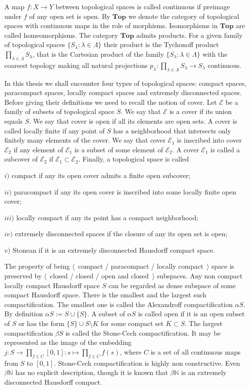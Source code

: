 A map $f:X\to Y$ between topological spaces is called continuous if preimage under $f$ of any open set is open. By $\mathbf{Top}$ we denote the category of topological spaces with continuous maps in the role of morphisms. Isomorphisms in $\mathbf{Top}$ are called homeomorphisms. The category $\mathbf{Top}$ admits  products. For a given family of topological spaces $\{S_\lambda:\lambda\in\Lambda\}$ their product is the Tychonoff product $\prod_{\lambda\in\Lambda}S_\lambda$, that is the Cartesian product of the family $\{S_\lambda:\lambda\in\Lambda\}$ with the coarsest topology making all natural projections $p_\lambda:\prod_{\lambda\in\Lambda}S_\lambda\to S_\lambda$ continuous.

In this thesis we shall encounter four types of topological spaces: compact spaces, paracompact spaces, locally compact spaces and extremely disconnected spaces. Before giving their definitions we need to recall the notion of cover. Let $\mathcal{E}$ be a family of subsets of topological space $S$. We say that $\mathcal{E}$ is a cover if its union equals $S$. We say that cover is open if all its elements are open sets. A cover is called locally finite if any point of $S$ has a neighborhood that intersects only finitely many elements of the cover. We say that cover $\mathcal{E}_1$ is inscribed into cover $\mathcal{E}_2$ if any element of $\mathcal{E}_1$ is a subset of some element of $\mathcal{E}_2$. A cover $\mathcal{E}_1$ is called a subcover of $\mathcal{E}_2$ if $\mathcal{E}_1\subset\mathcal{E}_2$. Finally, a topological space is called 

$i)$ compact if any its open cover admits a finite open subcover; 

$ii)$ paracompact if any its open cover is inscribed into some locally finite open cover; 

$iii)$ locally compact if any its point has a compact neighborhood;

$iv)$ extremely disconnected spaces if the closure of any its open set is open;

$v)$ Stonean if it is an extremely disconnected Hausdorff compact space.

The property of being $\langle$~compact / paracompact / locally compact~$\rangle$ space is preserved by $\langle$~closed / closed / open and closed~$\rangle$ subspaces. Any non compact locally compact Hausdorff space $S$ can be regarded as dense subspace of some compact Hausdorff space. There is the smallest and the largest such compactification. The smallest one is called the Alexandroff compactification $\alpha S$.  By definition $\alpha S:=S\cup \{S\}$. A subset of $\alpha S$ is called open if it is an open subset of $S$ or has the form $\{S\}\cup S\setminus K$ for some compact set $K\subset S$. The largest compactification $\beta S$ is called the Stone-Cech compactification. It may be represented as the image of the embedding $j:S\to\prod_{f\in C}[0,1]:s\mapsto \prod_{f\in C}f(s)$, where $C$ is a set of all continuous maps from $S$ to $[0,1]$. Stone-Cech compactification is highly non constructive. Even $\beta\mathbb{N}$ has no explicit description, though it is known that $\beta\mathbb{N}$ is an extremely disconnected Hausdorff compact.

